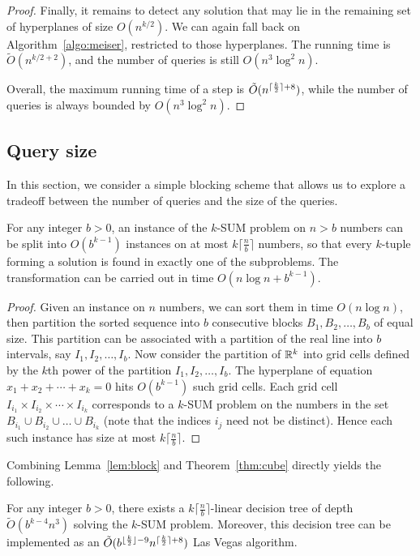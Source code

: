 \begin{proof}
Finally, it remains to detect any solution that may lie in the remaining
set of hyperplanes of size $O(n^{k/2})$. We can again fall back
on Algorithm~\ref{algo:meiser}, restricted to those hyperplanes. The running
time is $\tilde{O}(n^{k/2 + 2})$, and the number of queries is still
$O(n^3 \log^2 n)$.

Overall, the maximum running time of a step is $\tilde{O}(n^{\lceil\frac{k}{2}\rceil + 8})$,
while the number of queries is always bounded by $O(n^3\log^2 n)$.

\end{proof}

\subsection{Query size}
\label{sec:query-size}

In this section, we consider a simple blocking scheme that allows us to explore
a tradeoff between the number of queries and the size of the queries.

\begin{lemma}
\label{lem:block}
For any integer $b>0$, an instance of the \(k\)-SUM problem on $n>b$ numbers can be split into
$O(b^{k-1})$ instances on at most $k\lceil \frac{n}{b}\rceil$ numbers, so that every $k$-tuple
forming a solution is found in exactly one of the subproblems.
The transformation can be carried out in time $O(n\log n + b^{k-1})$.
\end{lemma}
\begin{proof}
Given an instance on $n$ numbers, we can sort them in time $O(n\log n)$, then partition
the sorted sequence into \(b\) consecutive blocks \(B_1, B_2,\ldots ,B_b\) of equal size.
This partition can be associated with a partition of the real line
into $b$ intervals, say $I_1, I_2,\ldots ,I_b$. Now consider the partition of $\mathbb{R}^k$
into grid cells defined by the $k$th power of the partition $I_1, I_2,\ldots ,I_b$. The
hyperplane of equation $x_1 + x_2 +\cdots +x_k = 0$ hits $O(b^{k-1})$ such grid cells.
Each grid cell $I_{i_1}\times I_{i_2}\times \cdots \times I_{i_k}$ corresponds to a
\(k\)-SUM problem on the numbers in the set $B_{i_1}\cup B_{i_2}\cup \ldots \cup B_{i_k}$ (note that
the indices $i_j$ need not be distinct). Hence each such instance has size at most $k\lceil \frac{n}{b}\rceil$.
\end{proof}

Combining Lemma~\ref{lem:block} and Theorem~\ref{thm:cube} directly yields the following.
\begin{theorem}\label{thm:query-size}
For any integer $b>0$, there exists a $k\lceil \frac{n}{b}\rceil$-linear
decision tree of depth \(\tilde{O}(b^{k-4} n^3)\) solving the \(k\)-SUM
problem.
Moreover, this decision tree can be implemented as an
$\tilde{O}(b^{\lfloor\frac{k}{2}\rfloor-9}n^{\lceil\frac{k}{2}\rceil+8})$
Las Vegas algorithm.
\end{theorem}

